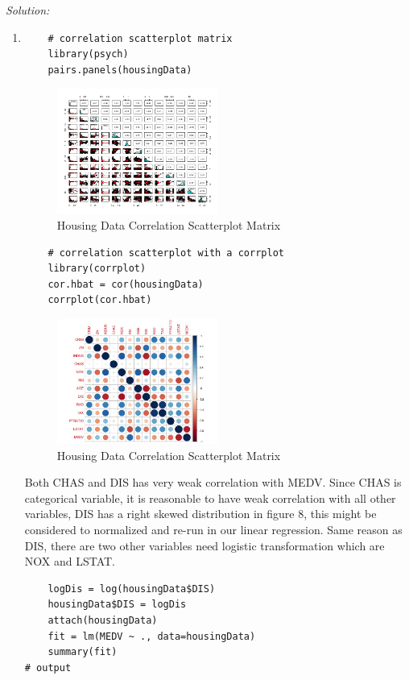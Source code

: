 \documentclass{article}
\newenvironment{solution}
    {\textit{Solution:}}
    {}
\begin{document}
\begin{solution}
\begin{enumerate}
	\item\mbox{}
	\begin{lstlisting}
	# correlation scatterplot matrix
	library(psych)
	pairs.panels(housingData)
	\end{lstlisting}
	\begin{figure}[h]
		\centering
		\includegraphics[width=0.5\textwidth]{figure8_Rplot.jpeg}
	\caption{Housing Data Correlation Scatterplot Matrix}
	\end{figure}
	\begin{lstlisting}
	# correlation scatterplot with a corrplot
	library(corrplot)
	cor.hbat = cor(housingData)
	corrplot(cor.hbat)
	\end{lstlisting}
		\begin{figure}[h]
		\centering
		\includegraphics[width=0.5\textwidth]{figure9_Rplot.jpeg}
		\caption{Housing Data Correlation Scatterplot Matrix}
	\end{figure}
\newpage
Both CHAS and DIS has very weak correlation with MEDV. Since CHAS is categorical variable, it is reasonable to have weak correlation with all other variables, DIS has a right skewed distribution in figure 8, this might be considered to normalized and re-run in our linear regression. Same reason as DIS, there are two other variables need logistic transformation which are NOX and LSTAT.
	\begin{lstlisting}
	logDis = log(housingData$DIS)
	housingData$DIS = logDis
	attach(housingData)
	fit = lm(MEDV ~ ., data=housingData)
	summary(fit)
# output

\end{lstlisting}
\end{enumerate}
\end{solution}
\end{document}
